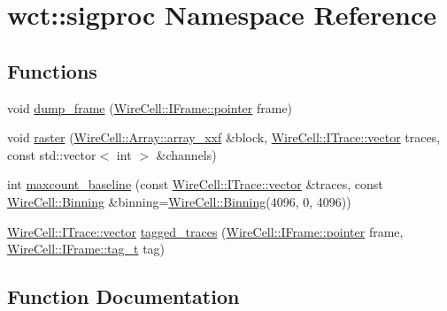 \hypertarget{namespacewct_1_1sigproc}{}\section{wct\+:\+:sigproc Namespace Reference}
\label{namespacewct_1_1sigproc}
\subsection*{Functions}
\begin{DoxyCompactItemize}
\item 
void \hyperlink{namespacewct_1_1sigproc_ad945dd464ab9a75f638922e67891daf3}{dump\+\_\+frame} (\hyperlink{class_wire_cell_1_1_i_data_aff870b3ae8333cf9265941eef62498bc}{Wire\+Cell\+::\+I\+Frame\+::pointer} frame)
\item 
void \hyperlink{namespacewct_1_1sigproc_ad081c59d5eae16e2375425a9e1a65679}{raster} (\hyperlink{namespace_wire_cell_1_1_array_ab565fef5e33632bb02f0ed4be803020c}{Wire\+Cell\+::\+Array\+::array\+\_\+xxf} \&block, \hyperlink{class_wire_cell_1_1_i_data_ae1a9f863380499bb43f39fabb6276660}{Wire\+Cell\+::\+I\+Trace\+::vector} traces, const std\+::vector$<$ int $>$ \&channels)
\item 
int \hyperlink{namespacewct_1_1sigproc_a51e6bea6697a8859f4ed81e2254412ab}{maxcount\+\_\+baseline} (const \hyperlink{class_wire_cell_1_1_i_data_ae1a9f863380499bb43f39fabb6276660}{Wire\+Cell\+::\+I\+Trace\+::vector} \&traces, const \hyperlink{class_wire_cell_1_1_binning}{Wire\+Cell\+::\+Binning} \&binning=\hyperlink{class_wire_cell_1_1_binning}{Wire\+Cell\+::\+Binning}(4096, 0, 4096))
\item 
\hyperlink{class_wire_cell_1_1_i_data_ae1a9f863380499bb43f39fabb6276660}{Wire\+Cell\+::\+I\+Trace\+::vector} \hyperlink{namespacewct_1_1sigproc_a7be8644ccb0052eb5c68551b924b9b6f}{tagged\+\_\+traces} (\hyperlink{class_wire_cell_1_1_i_data_aff870b3ae8333cf9265941eef62498bc}{Wire\+Cell\+::\+I\+Frame\+::pointer} frame, \hyperlink{class_wire_cell_1_1_i_frame_ae206ba618e10f398625dfeb675a4215a}{Wire\+Cell\+::\+I\+Frame\+::tag\+\_\+t} tag)
\end{DoxyCompactItemize}


\subsection{Function Documentation}
\mbox{\label{namespacewct_1_1sigproc_ad945dd464ab9a75f638922e67891daf3}} 
